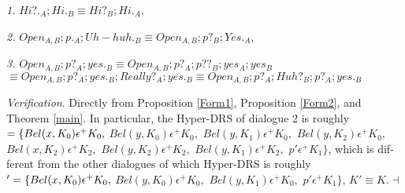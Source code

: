 \begin{Cor}
\begin{list}{}{\leftmargin=10mm }
\item[]
\item [{\it 1.}] $Hi?._A;Hi._B\equiv Hi?_B;Hi._A$,
\item [{\it 2.}] $Open_{A,B};p._A;Uh-huh._B\equiv Open_{A,B};p?_B;Yes._A$,
\item [{\it 3.}] $Open_{A,B};p?_A;yes._B\equiv Open_{A,B};p?_A;p??_B;yes_A;yes_B$\\
$\equiv Open_{A,B};p?_A;yes._B;Really?_A;yes._B \equiv Open_{A,B};p?_A;Huh?_B;p?_A;yes._B$
\end{list}
\end{Cor}
\par
{\it Verification}. Directly from Proposition \ref{Form1}, Proposition \ref{Form2}, and Theorem \ref{main}.
In particular, the Hyper-DRS of dialogue 2 is roughly
$=\{Bel(x,K_0)\epsilon^+K_0,$
$Bel(y,K_0)\epsilon^+K_0,$
$Bel(y,K_1)\epsilon^+K_0,$
$Bel(y,K_2)\epsilon^+K_0,$
$Bel(x,K_2)\epsilon^+K_2,$
$Bel(y,K_2)\epsilon^+K_2,$
$Bel(y,K_1)\epsilon^+K_2,$
$p'\epsilon^+K_1\}$, 
which is dif-ferent from the other dialogues of which Hyper-DRS is roughly
$'=\{Bel(x,K_0)\epsilon^+K_0,$
$Bel(y,K_0)\epsilon^+K_0,$
$Bel(y,K_1)\epsilon^+K_0,$
$p'\epsilon^+K_1\}$, 
$K'\equiv K$.$\dashv$
